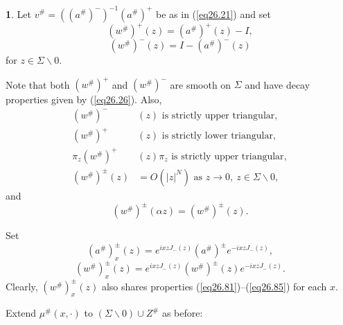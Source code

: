 \documentclass{surv-l}
\theoremstyle{plain}
\theoremstyle{definition}
\newtheorem{definition}[theorem]{\sc{Definition}}
\numberwithin{equation}{chapter}
\begin{document}
\renewcommand\thetheorem{26.\arabic{theorem}}
\setcounter{theorem}{77}
\begin{definition}\label{defi26.78}
Let $v^{\#}=((a^{\#})^{-})^{-1}(a^{\#})^{+}$ be as in (\ref{eq26.21}) and set
\setcounter{equation}{78}
\begin{equation}\label{eq26.79}
(w^{\#})^{+}(z)=(a^{\#})^{+}(z)-I,
\end{equation}
\begin{equation}\label{eq26.80}
(w^{\#})^{-}(z)=I-(a^{\#})^{-}(z)
\end{equation}
for $z\in\Sigma\backslash 0 $.

Note that both $(w^{\#})^{+}$ and $(w^{\#})^{-}$ are smooth on $\Sigma$ and have decay properties given by (\ref{eq26.26}). Also,
\begin{align}\label{eq26.81}
(w^{\#})^{-}&(z) \text{ is strictly upper triangular},\\\label{eq26.82}
(w^{\#})^{+}&(z)\text{ is strictly lower triangular},\\\label{eq26.83}
\pi_{z}(w^{\#})^{+}&(z)\pi_{z}\text{ is strictly upper triangular},\\\label{eq26.84}
(w^{\#})^{\pm}(z)&=O(|z|^{N}) \text{ as } z\rightarrow 0,\ z\in\Sigma\backslash 0,
\end{align}
and
\begin{equation}\label{eq26.85}
(w^{\#})^{\pm}(\alpha z)=(w^{\#})^{\pm}(z).
\end{equation}

Set
\begin{equation*}
(a^{\#})_{x}^{\pm}(z)=e^{ixzJ_{-}(z)}(a^{\#})^{\pm}e^{-ixzJ_{-}(z)},
\end{equation*}
\begin{equation*}
(w^{\#})_{x}^{\pm}(z)=e^{ixzJ_{-}(z)}(w^{\#})^{\pm}(z)e^{-ixzJ_{-}(z)}.
\end{equation*}
Clearly, $(w^{\#})_{x}^{\pm}(z)$ also shares properties
(\ref{eq26.81})--(\ref{eq26.85}) for each $x$.

Extend $\mu^{\#}(x, \cdot)$ to $(\Sigma\backslash 0)\cup Z^{\#}$ as before:
\end{definition}
\end{document}
